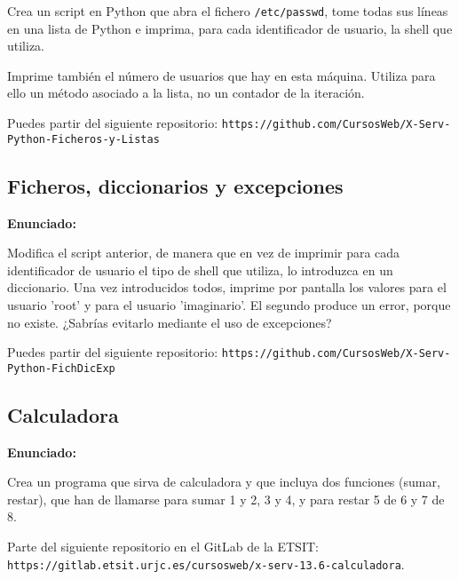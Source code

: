 Crea un script en Python que abra el fichero \verb|/etc/passwd|, tome todas sus líneas en una lista de Python e imprima, para cada identificador de usuario, la shell que utiliza.

Imprime también el número de usuarios que hay en esta máquina. Utiliza para
ello un método asociado a la lista, no un contador de la iteración.

Puedes partir del siguiente repositorio: \verb|https://github.com/CursosWeb/X-Serv-Python-Ficheros-y-Listas|

\subsection{Ficheros, diccionarios y excepciones}
\label{subsec:ficheros-dic-excep}

\textbf{Enunciado:}

Modifica el script
anterior, de manera que en vez de imprimir para cada identificador de usuario el tipo
de shell que utiliza, lo introduzca en un diccionario. Una vez introducidos todos, imprime por pantalla los valores para el usuario 'root' y para el
usuario 'imaginario'. El segundo produce un error, porque no existe. ¿Sabrías evitarlo mediante el uso de
excepciones?

Puedes partir del siguiente repositorio: \verb|https://github.com/CursosWeb/X-Serv-Python-FichDicExp|

\subsection{Calculadora}
\label{subsec:calculadora}

\textbf{Enunciado:}

Crea un programa que sirva de calculadora y que incluya dos funciones
(sumar, restar), que han de llamarse para sumar 1 y 2, 3 y 4, y para restar 5 de 6 y 7 de 8.


Parte del siguiente repositorio en el GitLab de la ETSIT: \\ \verb|https://gitlab.etsit.urjc.es/cursosweb/x-serv-13.6-calculadora|.

